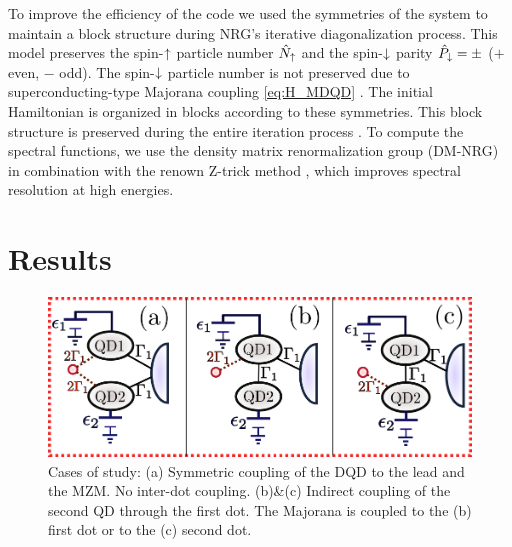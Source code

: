\documentclass[showpacs,aps,prb,reprint,superscriptaddress]{revtex4-1}
\begin{document}


To  improve the efficiency of the code we used the symmetries of the system to maintain a block structure during NRG's iterative diagonalization process. This model preserves the spin-$\uparrow$ particle number $\hat{N}_\uparrow$ and the spin-$\downarrow$ parity $\hat{P}_\downarrow = \pm $ ($+$ even, $-$ odd). The spin-$\downarrow$ particle number is not preserved due to superconducting-type Majorana coupling  \eqref{eq:H_MDQD} . The initial Hamiltonian is organized in blocks according to these symmetries. This block structure is preserved during the entire iteration process \cite{bulla_numerical_2008}. To compute the spectral functions, we use the density matrix renormalization group (DM-NRG)  \cite{hofstetter_generalized_2000} in combination with the renown Z-trick method \cite{oliveira_generalized_1994}, which improves spectral resolution at high energies.
  
 \section{Results \label{sec:results}}
\begin{figure}[h]
	\begin{center}
	\includegraphics[scale=0.5]{Graficos/MajoranaModels.png}
	\caption{\label{fig:MajoranaModels}  Cases of study: (a) Symmetric coupling of the DQD to the lead and the MZM. No inter-dot coupling. (b)\&(c) Indirect coupling of the second QD through the first dot. The Majorana is coupled to the (b) first dot or to the (c) second dot. 
	}
\end{center}
\end{figure}
\end{document}
